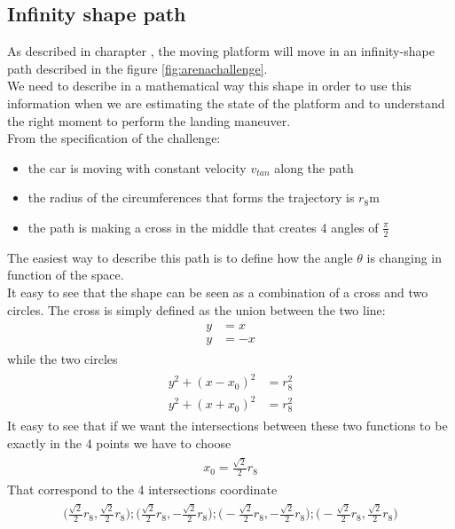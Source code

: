\subsection{Infinity shape path}
As described in charapter \label{chap:thechallenge}, the moving platform will move in an infinity-shape path described in the figure \ref{fig:arenachallenge}. \\
We need to describe in a mathematical way this shape in order to use this information when we are estimating the state of the platform and to understand the right moment to perform the landing maneuver.\\
From the specification of the challenge:
\begin{itemize}
\item the car is moving with constant velocity $v_{tan}$ along the path
\item the radius of the circumferences that forms the trajectory is $r_{8}$m
\item the path is making a cross in the middle that creates 4 angles of $\frac{\pi}{2}$ 
\end{itemize}
The easiest way to describe this path is to define how the angle $\theta$ is changing in function of the space. \\
It easy to see that the shape can be seen as a combination of a cross and two circles.
The cross is simply defined as the union between the two line:
\begin{align}
\begin{split}
y &= x \\
y &= -x
\end{split}
\end{align}
while the two circles 
\begin{align}
\begin{split}
y^2 + (x - x_0)^2 &= r_{8}^2 \\
y^2 + (x + x_0)^2 &= r_{8}^2 
\end{split}
\end{align}
It easy to see that if we want the intersections between these two functions to be exactly in the 4 points we have to choose 
\begin{align}
\begin{split}
x_0 = \frac{\sqrt{2}}{2}r_{8}
\end{split}
\end{align}
That correspond to the 4 intersections coordinate
\begin{align}
\begin{split}
\Big(\frac{\sqrt{2}}{2}r_{8},\frac{\sqrt{2}}{2}r_{8}\Big);
\Big(\frac{\sqrt{2}}{2}r_{8},-\frac{\sqrt{2}}{2}r_{8}\Big);
\Big(-\frac{\sqrt{2}}{2}r_{8},-\frac{\sqrt{2}}{2}r_{8}\Big);
\Big(-\frac{\sqrt{2}}{2}r_{8},\frac{\sqrt{2}}{2}r_{8}\Big)
\end{split}
\end{align}

